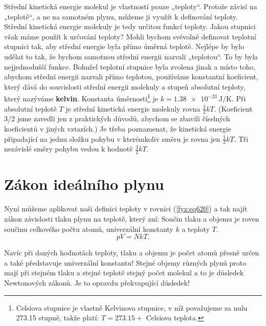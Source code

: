     Střední kinetická energie molekul je vlastností pouze „teploty“. Protože závisí na „teplotě“, a
    ne na samotném plynu, můžeme ji využít k definování teploty. Střední kinetická energie molekuly
    je tedy určitou funkcí teploty. Jakou stupnici však máme použít k určování teploty? Mohli bychom
    svévolně definovat teplotní stupnici tak, aby střední energie byla přímo úměrná teplotě. Nejlépe
    by bylo udělat to tak, že bychom samotnou střední energii nazvali „teplotou“. To by byla
    nejjednodušší funkce. Bohužel teplotní stupnice byla zvolena jinak a místo toho, abychom střední
    energii nazvali přímo teplotou, používáme konstantní koeﬁcient, který dává do souvislosti
    střední energii molekuly a stupeň absolutní teploty, který nazýváme \textbf{kelvin}. Konstanta
    úměrnosti\footnote{Celsiova stupnice je vlastně Kelvinova stupnice, v níž považujeme za nulu
    \num{273.15} stupně, takže platí: \(T = \num{273.15} +\) Celsiova teplota.} je \(k =
    \SI{1.38e-23}{\joule\per\kelvin}\). Při absolutní teplotě \(T\) je střední kinetická energie
    molekuly rovna \(\frac{3}{2}kT\). (Koeﬁcient \num{3/2} jsme zavedli jen z praktických důvodů,
    abychom se zbavili číselných koeﬁcientů v jiných vztazích.) Je třeba poznamenat, že kinetická
    energie připadající na jednu složku pohybu v kterémkoliv směru je rovna jen \(\frac{1}{2}kT\).
    Tři nezávislé směry pohybu vedou k hodnotě \(\frac{3}{2}kT\).

  \section{Zákon ideálního plynu}\label{fyz:IchapIXLsecV}
    Nyní můžeme aplikovat naši definici teploty v rovnici (\ref{fyz:eq620}) a tak najít zákon
    závislosti tlaku plynu na teplotě, který zní: Součin tlaku a objemu je roven součinu celkového
    počtu atomů, univerzální konstanty \(k\) a teploty \(T\).
    \begin{equation}\label{fyz:eq632}
      \boxed{pV=NkT}.
    \end{equation}

    Navíc při daných hodnotách teploty, tlaku a objemu je počet atomů přesně určen a také
    představuje univerzální konstantu! Stejné objemy různých plynů proto mají při stejném tlaku a
    stejné teplotě stejný počet molekul a to je důsledek Newtonových zákonů. Je to opravdu
    překvapující důsledek!

